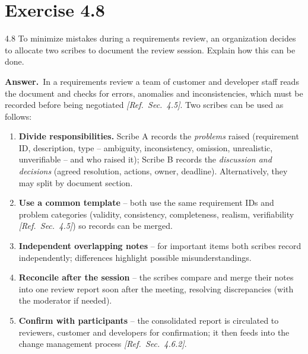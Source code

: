 \documentclass[11pt,a4paper]{article}
\newcommand{\answer}{\par\noindent\textbf{Answer.}\ }
\newcommand{\refsec}[1]{\hfill\textit{\small[Ref.\ Sec.~#1]}}
\begin{document}
\section*{Exercise 4.8}
\begin{question}{4.8}
To minimize mistakes during a requirements review, an organization decides to allocate two scribes to
document the review session. Explain how this can be done.
\end{question}
\answer In a requirements review a team of customer and developer staff reads the document and checks
for errors, anomalies and inconsistencies, which must be recorded before being negotiated \refsec{4.5}.
Two scribes can be used as follows:
\begin{enumerate}[leftmargin=*]
  \item \textbf{Divide responsibilities.} Scribe A records the \emph{problems} raised (requirement ID,
  description, type -- ambiguity, inconsistency, omission, unrealistic, unverifiable -- and who raised it);
  Scribe B records the \emph{discussion and decisions} (agreed resolution, actions, owner, deadline).
  Alternatively, they may split by document section.
  \item \textbf{Use a common template} -- both use the same requirement IDs and problem categories
  (validity, consistency, completeness, realism, verifiability \refsec{4.5}) so records can be merged.
  \item \textbf{Independent overlapping notes} -- for important items both scribes record independently;
  differences highlight possible misunderstandings.
  \item \textbf{Reconcile after the session} -- the scribes compare and merge their notes into one review
  report soon after the meeting, resolving discrepancies (with the moderator if needed).
  \item \textbf{Confirm with participants} -- the consolidated report is circulated to reviewers, customer
  and developers for confirmation; it then feeds into the change management process \refsec{4.6.2}.
\end{enumerate}

\end{document}
